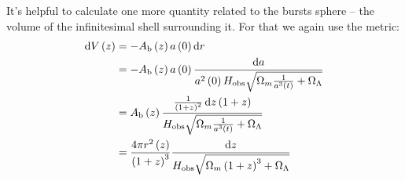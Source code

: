 \documentclass[manuscript]{aastex}
\begin{document}
It's helpful to calculate one more quantity related to the bursts
sphere -- the volume of the infinitesimal shell surrounding it. For
that we again use the metric:
\begin{align}
\dif V\left(z\right) &= - A_\text{b}\left(z\right) a\left(0\right) \dif r \nonumber\\
&= - A_\text{b}\left(z\right) a\left(0\right) \frac{\dif a}{a^2\left(0\right) H_\text{obs} \sqrt{\Omega_m\frac{1}{a^3\left(t\right)} + \Omega_\Lambda}} \nonumber\\
&= A_\text{b}\left(z\right) \frac{\frac{1}{\left(1+z\right)^2}\dif z \left(1+z\right)}{H_\text{obs} \sqrt{\Omega_m\frac{1}{a^3\left(t\right)} + \Omega_\Lambda}} \nonumber\\
&= \frac{4\pi r^2\left(z\right)}{\left(1+z\right)^3} \frac{\dif z}{H_\text{obs} \sqrt{\Omega_m\left(1+z\right)^3 + \Omega_\Lambda}}
\end{align}
\end{document}
